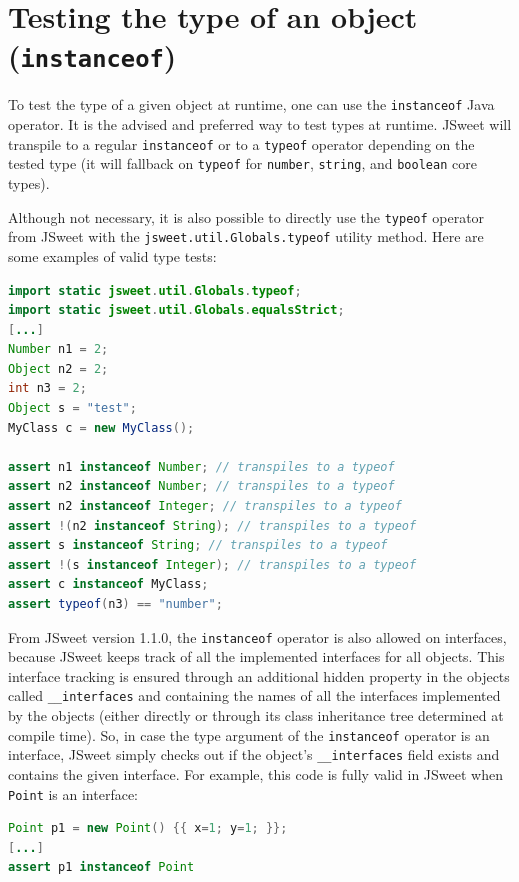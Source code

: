 \documentclass[a4paper]{report}
\begin{document}
\section{Testing the type of an object (\texttt{instanceof})}

To test the type of a given object at runtime, one can use the \texttt{instanceof} Java operator. It is the advised and preferred way to test types at runtime. JSweet will transpile to a regular \texttt{instanceof} or to a \texttt{typeof} operator depending on the tested type (it will fallback on \texttt{typeof} for \texttt{number}, \texttt{string}, and \texttt{boolean} core types).

Although not necessary, it is also possible to directly use the \texttt{typeof} operator from JSweet with the \texttt{jsweet.\-util.\-Globals.\-typeof} utility method. Here are some examples of valid type tests:

\begin{lstlisting}[language=Java]
import static jsweet.util.Globals.typeof;
import static jsweet.util.Globals.equalsStrict;
[...]
Number n1 = 2;
Object n2 = 2;
int n3 = 2;
Object s = "test";
MyClass c = new MyClass();

assert n1 instanceof Number; // transpiles to a typeof
assert n2 instanceof Number; // transpiles to a typeof
assert n2 instanceof Integer; // transpiles to a typeof
assert !(n2 instanceof String); // transpiles to a typeof
assert s instanceof String; // transpiles to a typeof
assert !(s instanceof Integer); // transpiles to a typeof
assert c instanceof MyClass;
assert typeof(n3) == "number";
\end{lstlisting}

From JSweet version 1.1.0, the \texttt{instanceof} operator is also allowed on interfaces, because JSweet keeps track of all the implemented interfaces for all objects. This interface tracking is ensured through an additional hidden property in the objects called \texttt{\_\_interfaces} and containing the names of all the interfaces implemented by the objects (either directly or through its class inheritance tree determined at compile time). So, in case the type argument of the \texttt{instanceof} operator is an interface, JSweet simply checks out if the object's \texttt{\_\_interfaces} field exists and contains the given interface. For example, this code is fully valid in JSweet when \texttt{Point} is an interface:
 
\begin{lstlisting}[language=Java]
Point p1 = new Point() {{ x=1; y=1; }};
[...]
assert p1 instanceof Point
\end{lstlisting}
\end{document}
